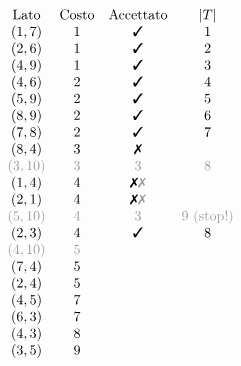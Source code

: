 \documentclass[10pt,a4paper,twoside,openright]{book}
\newcommand{\cmark}{\ding{51}}%
\newcommand{\xmark}{\ding{55}}%
\numberwithin{es}{chapter}
\begin{document}
\begin{equation*}
\begin{array}{ c c c c }
\text{Lato} & \text{Costo} & \text{Accettato} & | T| \\
( 1,7) & 1 & \text{\cmark}  & 1\\
( 2,6) & 1 & \text{\cmark}  & 2\\
( 4,9) & 1 & \text{\cmark}  & 3\\
( 4,6) & 2 & \text{\cmark}  & 4\\
( 5,9) & 2 & \text{\cmark}  & 5\\
( 8,9) & 2 & \text{\cmark}  & 6\\
( 7,8) & 2 & \text{\cmark}  & 7\\
( 8,4) & 3 & \text{\xmark}  & \\
\textcolor[rgb]{0.61,0.61,0.61}{( 3,10)} & \textcolor[rgb]{0.61,0.61,0.61}{3} & \textcolor[rgb]{0.61,0.61,0.61}{\cmark } & \textcolor[rgb]{0.61,0.61,0.61}{8}\\
( 1,4) & 4 & \text{\xmark \textcolor[rgb]{0.61,0.61,0.61}{\xmark }} & \\
( 2,1) & 4 & \text{\xmark \textcolor[rgb]{0.61,0.61,0.61}{\xmark }} & \\
\textcolor[rgb]{0.61,0.61,0.61}{( 5,10}\textcolor[rgb]{0.61,0.61,0.61}{)} & \textcolor[rgb]{0.61,0.61,0.61}{4} & \textcolor[rgb]{0.61,0.61,0.61}{\cmark } & \textcolor[rgb]{0.61,0.61,0.61}{9\ \text{(stop!)}}\\
( 2,3) & 4 & \text{\cmark}  & 8\\
\textcolor[rgb]{0.61,0.61,0.61}{( 4,10}\textcolor[rgb]{0.61,0.61,0.61}{)} & \textcolor[rgb]{0.61,0.61,0.61}{5} &  & \\
( 7,4) & 5 &  & \\
( 2,4) & 5 &  & \\
( 4,5) & 7 &  & \\
( 6,3) & 7 &  & \\
( 4,3) & 8 &  & \\
( 3,5) & 9 &  & 
\end{array}
\end{equation*}
\end{document}
